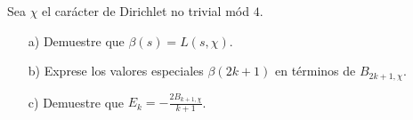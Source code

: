\begin{ejercicio}[Continuación]
  Sea $\chi$ el carácter de Dirichlet no trivial mód $4$.

  \begin{enumerate}
  \item[a)] Demuestre que $\beta (s) = L (s,\chi)$.

  \item[b)] Exprese los valores especiales $\beta (2k+1)$ en términos de
    $B_{2k+1,\chi}$.

  \item[c)] Demuestre que $E_k = -\frac{2B_{k+1,\chi}}{k+1}$.
  \end{enumerate}
\end{ejercicio}
